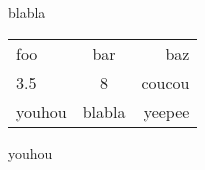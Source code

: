 blabla
\begin{tabular}{|l|c|r|}
    foo & bar & baz \\
    3.5 & 8 & coucou \\
    youhou & blabla & yeepee
\end{tabular}
youhou
